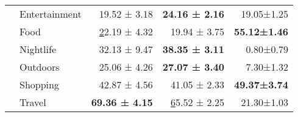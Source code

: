 \begin{table}[htbp]
{\begin{tabular}{|ll|r|r|r|}
\multicolumn{1}{|l|}{} & Entertainment & 19.52 ± 3.18 & \textbf{24.16 ± 2.16} & 19.05±1.25 \\ \cline{2-5} 
\multicolumn{1}{|l|}{} & Food & {\ul 22.19 ± 4.32} & 19.94 ± 3.75 & \textbf{55.12±1.46} \\ \cline{2-5} 
\multicolumn{1}{|l|}{} & Nightlife & 32.13 ± 9.47 & \textbf{38.35 ± 3.11} & 0.80±0.79 \\ \cline{2-5} 
\multicolumn{1}{|l|}{} & Outdoors & 25.06 ± 4.26 & \textbf{27.07 ± 3.40} & 7.30±1.32 \\ \cline{2-5} 
\multicolumn{1}{|l|}{} & Shopping & 42.87 ± 4.56 & 41.05 ± 2.33 & \textbf{49.37±3.74} \\ \cline{2-5} 
\multicolumn{1}{|l|}{} & Travel & \textbf{69.36 ± 4.15} & {\ul 65.52 ± 2.25} & 21.30±1.03 \\ \hline
\end{tabular}%
}

\label{table:next}
\end{table}